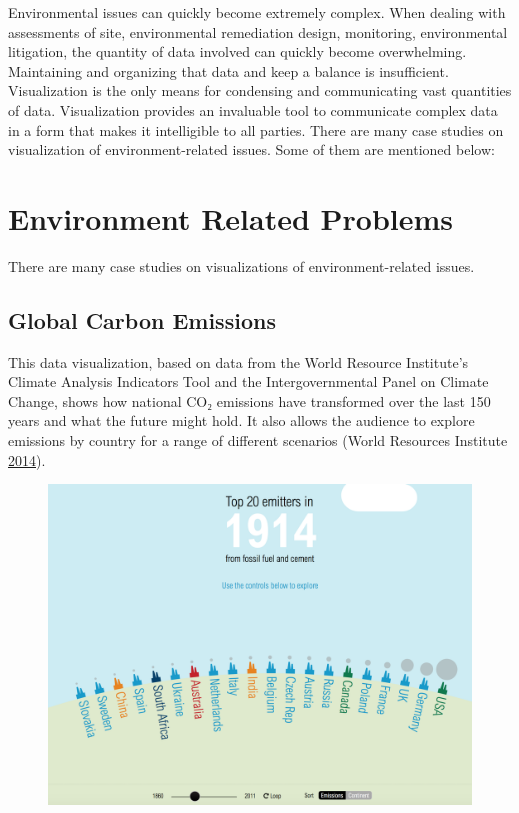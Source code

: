 \documentclass[]{book}
\theoremstyle{definition}
\theoremstyle{definition}
\theoremstyle{definition}
\theoremstyle{remark}
\begin{document}
Environmental issues can quickly become extremely complex. When dealing
with assessments of site, environmental remediation design, monitoring,
environmental litigation, the quantity of data involved can quickly
become overwhelming. Maintaining and organizing that data and keep a
balance is insufficient. Visualization is the only means for condensing
and communicating vast quantities of data. Visualization provides an
invaluable tool to communicate complex data in a form that makes it
intelligible to all parties. There are many case studies on
visualization of environment-related issues. Some of them are mentioned
below:

\section{Environment Related
Problems}\label{environment-related-problems}

There are many case studies on visualizations of environment-related
issues.

\subsection{Global Carbon Emissions}\label{global-carbon-emissions}

This data visualization, based on data from the World Resource
Institute's Climate Analysis Indicators Tool and the Intergovernmental
Panel on Climate Change, shows how national CO₂ emissions have
transformed over the last 150 years and what the future might hold. It
also allows the audience to explore emissions by country for a range of
different scenarios (World Resources Institute
\protect\hyperlink{ref-CO2_emission}{2014}).

\begin{figure}
\centering
\includegraphics{images/carbon_emissions.png}
\caption{}
\end{figure}
\end{document}

